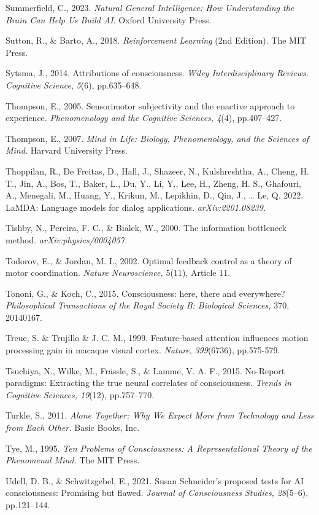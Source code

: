 \documentclass[12pt]{article}
\begin{document}
Summerfield, C., 2023. \emph{Natural General Intelligence: How
Understanding the Brain Can Help Us Build AI}. Oxford University Press.

Sutton, R., \& Barto, A., 2018. \emph{Reinforcement Learning} (2nd
Edition). The MIT Press.

Sytsma, J., 2014. Attributions of consciousness. \emph{Wiley
Interdisciplinary Reviews. Cognitive Science}, \emph{5}(6), pp.635--648.

Thompson, E., 2005. Sensorimotor subjectivity and the enactive approach
to experience. \emph{Phenomenology and the Cognitive Sciences, 4}(4),
pp.407--427.

Thompson, E., 2007. \emph{Mind in Life: Biology, Phenomenology, and the
Sciences of Mind.} Harvard University Press.

Thoppilan, R., De Freitas, D., Hall, J., Shazeer, N., Kulshreshtha, A.,
Cheng, H. T., Jin, A., Bos, T., Baker, L., Du, Y., Li, Y., Lee, H.,
Zheng, H. S., Ghafouri, A., Menegali, M., Huang, Y., Krikun, M.,
Lepikhin, D., Qin, J., \ldots{} Le, Q. 2022. LaMDA: Language models for
dialog applications. \emph{arXiv:2201.08239.}

Tishby, N., Pereira, F. C., \& Bialek, W., 2000. The information
bottleneck method. \emph{arXiv:physics/0004057.}

Todorov, E., \& Jordan, M. I., 2002. Optimal feedback control as a
theory of motor coordination. \emph{Nature Neuroscience,} 5(11), Article
11.

Tononi, G., \& Koch, C., 2015. Consciousness: here, there and
everywhere? \emph{Philosophical Transactions of the Royal Society B:
Biological Sciences,} 370, 20140167.

Treue, S. \& Trujillo \& J. C. M., 1999. Feature-based attention influences
motion processing gain in macaque visual cortex. \emph{Nature},
\emph{399}(6736), pp.575-579.

Tsuchiya, N., Wilke, M., Frässle, S., \& Lamme, V. A. F., 2015.
No-Report paradigms: Extracting the true neural correlates of
consciousness. \emph{Trends in Cognitive Sciences, 19}(12), pp.757--770.

Turkle, S., 2011. \emph{Alone Together: Why We Expect More from
Technology and Less from Each Other.} Basic Books, Inc.

Tye, M., 1995. \emph{Ten Problems of Consciousness: A Representational
Theory of the Phenomenal Mind.} The MIT Press.

Udell, D. B., \& Schwitzgebel, E., 2021. Susan Schneider's proposed
tests for AI consciousness: Promising but flawed. \emph{Journal of
Consciousness Studies, 28}(5--6), pp.121--144.
\end{document}
